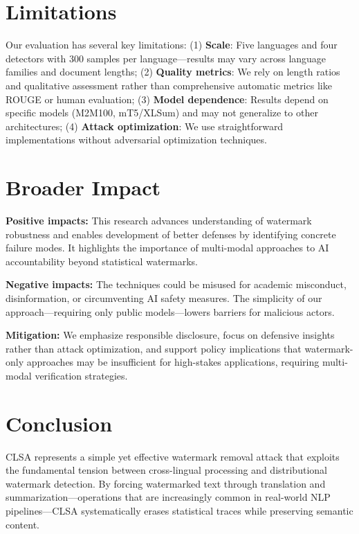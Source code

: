 \documentclass{article}
\begin{document}
\section{Limitations}

Our evaluation has several key limitations: (1) \textbf{Scale}: Five languages and four detectors with 300 samples per language—results may vary across language families and document lengths; (2) \textbf{Quality metrics}: We rely on length ratios and qualitative assessment rather than comprehensive automatic metrics like ROUGE or human evaluation; (3) \textbf{Model dependence}: Results depend on specific models (M2M100, mT5/XLSum) and may not generalize to other architectures; (4) \textbf{Attack optimization}: We use straightforward implementations without adversarial optimization techniques.

\section{Broader Impact}

\textbf{Positive impacts:} This research advances understanding of watermark robustness and enables development of better defenses by identifying concrete failure modes. It highlights the importance of multi-modal approaches to AI accountability beyond statistical watermarks.

\textbf{Negative impacts:} The techniques could be misused for academic misconduct, disinformation, or circumventing AI safety measures. The simplicity of our approach—requiring only public models—lowers barriers for malicious actors.

\textbf{Mitigation:} We emphasize responsible disclosure, focus on defensive insights rather than attack optimization, and support policy implications that watermark-only approaches may be insufficient for high-stakes applications, requiring multi-modal verification strategies.

\section{Conclusion}

CLSA represents a simple yet effective watermark removal attack that exploits the fundamental tension between cross-lingual processing and distributional watermark detection. By forcing watermarked text through translation and summarization—operations that are increasingly common in real-world NLP pipelines—CLSA systematically erases statistical traces while preserving semantic content.
\end{document}
